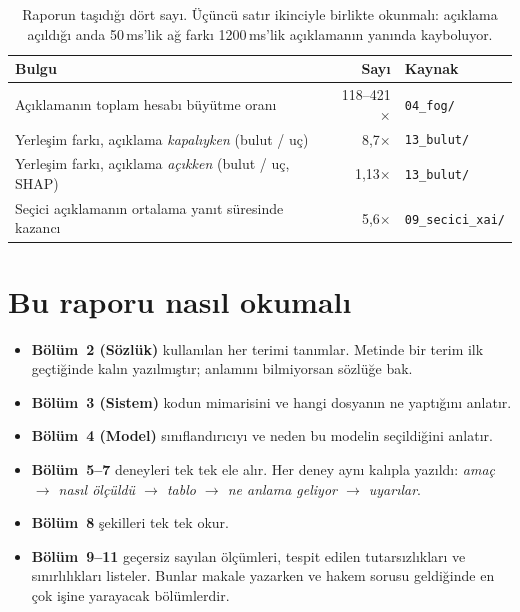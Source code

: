 \documentclass[11pt,a4paper]{report}
\newcommand{\ms}{\,ms}
\newcommand{\dosya}[1]{\texttt{\footnotesize #1}}
\begin{document}
\begin{table}[H]
\centering\small
\begin{tabular}{@{}p{6.4cm}rl@{}}
\toprule
\textbf{Bulgu} & \textbf{Sayı} & \textbf{Kaynak} \\
\midrule
Açıklamanın toplam hesabı büyütme oranı & 118--421$\times$ & \dosya{04\_fog/} \\
Yerleşim farkı, açıklama \emph{kapalıyken} (bulut / uç) & 8{,}7$\times$ & \dosya{13\_bulut/} \\
Yerleşim farkı, açıklama \emph{açıkken} (bulut / uç, SHAP) & 1{,}13$\times$ & \dosya{13\_bulut/} \\
Seçici açıklamanın ortalama yanıt süresinde kazancı & 5{,}6$\times$ & \dosya{09\_secici\_xai/} \\
\bottomrule
\end{tabular}
\caption{Raporun taşıdığı dört sayı. Üçüncü satır ikinciyle birlikte okunmalı:
açıklama açıldığı anda 50\ms{}'lik ağ farkı 1200\ms{}'lik açıklamanın yanında
kayboluyor.}
\end{table}

\section{Bu raporu nasıl okumalı}

\begin{itemize}[leftmargin=1.4em]
\item \textbf{Bölüm~2 (Sözlük)} kullanılan her terimi tanımlar. Metinde bir
terim ilk geçtiğinde kalın yazılmıştır; anlamını bilmiyorsan sözlüğe bak.
\item \textbf{Bölüm~3 (Sistem)} kodun mimarisini ve hangi dosyanın ne yaptığını
anlatır.
\item \textbf{Bölüm~4 (Model)} sınıflandırıcıyı ve neden bu modelin seçildiğini
anlatır.
\item \textbf{Bölüm~5--7} deneyleri tek tek ele alır. Her deney aynı kalıpla
yazıldı: \emph{amaç $\rightarrow$ nasıl ölçüldü $\rightarrow$ tablo $\rightarrow$
ne anlama geliyor $\rightarrow$ uyarılar}.
\item \textbf{Bölüm~8} şekilleri tek tek okur.
\item \textbf{Bölüm~9--11} geçersiz sayılan ölçümleri, tespit edilen tutarsızlıkları
ve sınırlılıkları listeler. Bunlar makale yazarken ve hakem sorusu geldiğinde
en çok işine yarayacak bölümlerdir.
\end{itemize}

\end{document}
